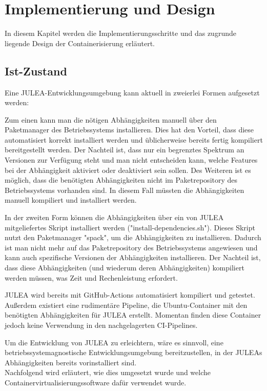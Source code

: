 \chapter{Implementierung und Design}
\label{cha:implementation_design}

In diesem Kapitel werden die Implementierungsschritte und das zugrunde liegende Design der Containerisierung erläutert.

\section{Ist-Zustand} \label{sec:ist-zustand}

Eine JULEA-Entwicklungsumgebung kann aktuell in zweierlei Formen aufgesetzt werden:

Zum einen kann man die nötigen Abhängigkeiten manuell über den Paketmanager des Betriebssystems installieren. Dies hat den Vorteil, dass diese automatisiert korrekt installiert werden und üblicherweise bereits fertig kompiliert bereitgestellt werden. Der Nachteil ist, dass nur ein begrenztes Spektrum an Versionen zur Verfügung steht und man nicht entscheiden kann, welche Features bei der Abhängigkeit aktiviert oder deaktiviert sein sollen. Des Weiteren ist es möglich, dass die benötigten Abhängigkeiten nicht im Paketrepository des Betriebssystems vorhanden sind. In diesem Fall müssten die Abhängigkeiten manuell kompiliert und installiert werden. 

In der zweiten Form können die Abhängigkeiten über ein von JULEA mitgeliefertes Skript installiert werden ("install-dependencies.sh"). Dieses Skript nutzt den Paketmanager "spack", um die Abhängigkeiten zu installieren. Dadurch ist man nicht mehr auf das Paketrepository des Betriebssystems angewiesen und kann auch spezifische Versionen der Abhängigkeiten installieren. Der Nachteil ist, dass diese Abhängigkeiten (und wiederum deren Abhängigkeiten) kompiliert werden müssen, was Zeit und Rechenleistung erfordert. 

JULEA wird bereits mit GitHub-Actions automatisiert kompiliert und getestet. Außerdem existiert eine rudimentäre Pipeline, die Ubuntu-Container mit den benötigten Abhängigkeiten für JULEA erstellt. Momentan finden diese Container jedoch keine Verwendung in den nachgelagerten CI-Pipelines. 

Um die Entwicklung von JULEA zu erleichtern, wäre es sinnvoll, eine betriebssystemagnostische Entwicklungsumgebung bereitzustellen, in der JULEAs Abhängigkeiten bereits vorinstalliert sind. \\
Nachfolgend wird erläutert, wie dies umgesetzt wurde und welche Containervirtualisierungssoftware dafür verwendet wurde.

